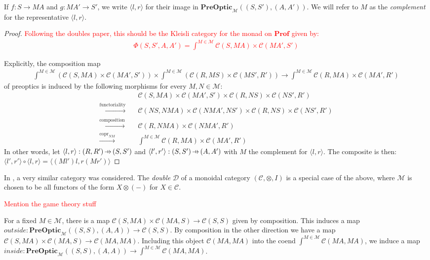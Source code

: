 \documentclass[11pt,a4paper]{article}
\theoremstyle{plain}
\theoremstyle{definition}
\newcommand{\C}{\mathscr{C}}
\newcommand{\M}{\mathscr{M}}
\newcommand{\Double}{\mathcal{D}}
\newcommand{\Prof}{\mathbf{Prof}}
\newcommand{\PreOptic}{\mathbf{PreOptic}}
\DeclareMathOperator{\copr}{copr}
\newcommand{\hto}{\ensuremath{\,\mathaccent\shortmid\rightarrow\,}}
\newcommand{\todo}[1]{\textcolor{red}{\small #1}}
\begin{document}
If $f : S \to M A$ and $g : M A' \to S'$, we write $\langle l, r \rangle$ for their image in $\PreOptic_\M((S, S'), (A, A'))$. We will refer to $M$ as the \emph{complement} for the representative $\langle l, r \rangle$.
\begin{proof}
\todo{Following the doubles paper, this should be the Kleisli category for the monad on $\Prof$ given by:
\begin{align*}
\Phi(S, S', A, A') = \int^{M \in \M} \C(S, M A) \times \C(M A', S')
\end{align*}
}

Explicitly, the composition map
\begin{align*}
\int^{M \in \M} \left(\C(S, M A) \times \C(M A', S')\right) \times \int^{M \in \M} \left( \C(R, M S) \times \C(M S', R')\right) \to \int^{M \in \M} \C(R, M A) \times \C(M A', R')
\end{align*}
of preoptics is induced by the following morphisms for every $M, N \in \M$:
\begin{align*}
&\C(S, M A) \times \C(M A', S') \times \C(R, N S) \times \C(N S', R')\\
\xrightarrow{\text{functoriality}} \quad& \C(NS, NM A) \times \C(NM A', NS') \times \C(R, N S) \times \C(N S', R')\\
\xrightarrow{\text{composition}} \quad& \C(R, N M A) \times \C(N M A', R') \\
\xrightarrow{\copr_{NM}} \quad&\int^{M \in \M} \C(R, M A) \times \C(M A', R')
\end{align*}
In other words, let $\langle l, r \rangle : (R, R') \hto (S, S')$ and $\langle l', r' \rangle : (S, S') \hto (A, A')$ with $M$ the complement for $\langle l, r \rangle$. The composite is then: $\langle l', r' \rangle \circ \langle l, r \rangle = \langle (M l')l, r(Mr') \rangle$
\end{proof}

In \cite{Doubles}, a very similar category was considered. The \emph{double} $\Double$ of a monoidal category $(\C, \otimes, I)$ is a special case of the above, where $\M$ is chosen to be all functors of the form $X \otimes (-)$ for $X \in \C$. 

\todo{Mention the game theory stuff}

For a fixed $M \in \M$, there is a map $\C(S, M A) \times \C(M A, S) \to \C(S, S)$ given by composition. This induces a map $outside : \PreOptic_\M((S, S), (A, A)) \to \C(S, S)$. By composition in the other direction we have a map $\C(S, M A) \times \C(M A, S) \to \C(M A, M A)$. Including this object $\C(M A, M A)$ into the coend $\int^{M \in \M} \C(M A, M A)$, we induce a map $inside : \PreOptic_\M((S, S), (A,A)) \to \int^{M \in \M} \C(M A, M A)$.
\end{document}

